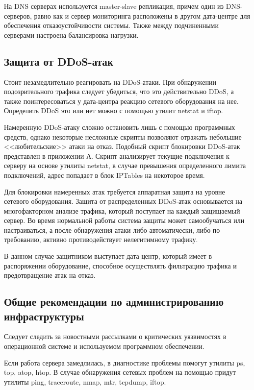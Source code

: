 На DNS серверах используется master-slave репликация, причем один из DNS-серверов, равно как и сервер мониторинга расположены в другом дата-центре для обеспечения отказоустойчивости системы.
Также между подчиненными серверами настроена балансировка нагрузки.

\subsection{Защита от DDoS-атак}

Стоит незамедлительно реагировать на DDoS-атаки.
При обнаружении подозрительного трафика следует убедиться, что это действительно DDoS, а также поинтересоваться у дата-центра реакцию сетевого оборудования на нее.
Определить DDoS это или нет можно с помощью утилит netstat и iftop.

Намеренную DDoS-атаку сложно остановить лишь с помощью программных средств, однако некоторые несложные скрипты позволяют отражать небольшие <<любительские>> атаки на отказ.
Подобный скрипт блокировки DDoS-атак представлен в приложении А.
Скрипт анализирует текущие подключения к серверу на основе утилиты netstat, в случае превышения определенного лимита подключений, адрес попадает в блок IPTables на некоторое время.

Для блокировки намеренных атак требуется аппаратная защита на уровне сетевого оборудования.
Защита от распределенных DDoS-атак основывается на мно­го­фак­тор­ном анализе трафика, который поступает на каждый защищаемый сервер.
Во время нормальной работы система защиты может самообучаться или настраиваться, а после обнаружения атаки либо автоматически, либо по требованию, активно про­тиво­дей­ству­ет нелегитимному трафику.

В данном случае защитником выступает дата-центр, который имеет в распоряжении оборудование, способное осуществлять фильтрацию трафика и предотвращение атак на отказ.

\subsection{Общие рекомендации по администрированию инфраструктуры}

Следует следить за новостными рассылками о критических уязвимостях в операционной системе и используемом программном обеспечении.

Если работа сервера замедлилась, в диагностике проблемы помогут утилиты ps, top, atop, htop.
В случае обнаружения сетевых проблем на помощью придут утилиты ping, traceroute, nmap, mtr, tcpdump, iftop.

